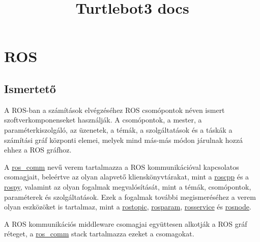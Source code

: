 \documentclass{article}
\title{Turtlebot3 docs}
\author{}
\date{}
\begin{document}
\maketitle

\tableofcontents

\section{ROS}
\subsection{Ismertető}
A ROS-ban a számítások elvégzéséhez ROS csomópontok néven ismert szoftverkomponenseket használják. A csomópontok, a mester, a paraméterkiszolgáló, az üzenetek, a témák, a szolgáltatások és a táskák a számítási gráf központi elemei, melyek mind más-más módon járulnak hozzá ehhez a ROS gráfhoz.

A \href{http://wiki.ros.org/ros_comm}{ros\_comm} nevű verem tartalmazza a ROS kommunikációval kapcsolatos csomagjait, beleértve az olyan alapvető klienskönyvtárakat, mint a \href{http://wiki.ros.org/roscpp}{roscpp} és a \href{http://wiki.ros.org/rospy}{rospy}, valamint az olyan fogalmak megvalósítását, mint a témák, csomópontok, paraméterek és szolgáltatások. Ezek a fogalmak további megismeréséhez a verem olyan eszközöket is tartalmaz, mint a \href{http://wiki.ros.org/rostopic}{rostopic}, \href{http://wiki.ros.org/rosparam}{rosparam}, \href{http://wiki.ros.org/rosservice}{rosservice} és \href{http://wiki.ros.org/rosnode}{rosnode}.

A ROS kommunikációs middleware csomagjai együttesen alkotják a ROS gráf réteget, a \href{http://wiki.ros.org/ros_comm}{ros\_comm} stack tartalmazza ezeket a csomagokat.
\end{document}
